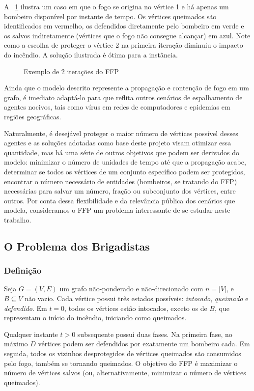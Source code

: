 \documentclass{MO824}
\begin{document}
    A \figurename~\ref{fig:exemplo} ilustra um caso em que o fogo se origina no vértice 1 e há apenas um bombeiro disponível por instante de tempo. Os vértices queimados são identificados em vermelho, os defendidos diretamente pelo bombeiro em verde e os salvos indiretamente (vértices que o fogo não consegue alcançar) em azul. Note como a escolha de proteger o vértice 2 na primeira iteração diminuiu o impacto do incêndio. A solução ilustrada é ótima para a instância.

    \begin{figure}
    \caption{Exemplo de 2 iterações do FFP}
    \label{fig:exemplo}
    \end{figure}
    
    Ainda que o modelo descrito represente a propagação e contenção de fogo em um grafo, é imediato adaptá-lo para que reflita outros cenários de espalhamento de agentes nocivos, tais como vírus em redes de computadores e epidemias em regiões geográficas. 
    
    Naturalmente, é desejável proteger o maior número de vértices possível desses agentes e as soluções adotadas como base deste projeto visam otimizar essa quantidade, mas há uma série de outros objetivos que podem ser derivados do modelo: minimizar o número de unidades de tempo até que a propagação acabe, determinar se todos os vértices de um conjunto específico podem ser protegidos, encontrar o número necessário de entidades (bombeiros, se tratando do FFP) necessárias para salvar um número, fração ou subconjunto dos vértices, entre outros. Por conta dessa flexibilidade e da relevância pública dos cenários que modela, consideramos o FFP um problema interessante de se estudar neste trabalho.

\subsection{O Problema dos Brigadistas}
    \subsubsection{Definição}
    Seja $G=(V,E)$ um grafo não-ponderado e não-direcionado com $n = |V|$, e $B \subseteq V$ não vazio. Cada vértice possui três estados possíveis: \textit{intocado}, \textit{queimado} e \textit{defendido}. Em $t=0$, todos os vértices estão intocados, exceto os de $B$, que representam o início do incêndio, iniciando como queimados. 
    
    Qualquer instante $t>0$ subsequente possui duas fases. Na primeira fase, no máximo $D$ vértices podem ser defendidos por exatamente um bombeiro cada. Em seguida, todos os vizinhos desprotegidos de vértices queimados são consumidos pelo fogo, também se tornando queimados. O objetivo do FFP é maximizar o número de vértices salvos (ou, alternativamente, minimizar o número de vértices queimados).
    
\end{document}
